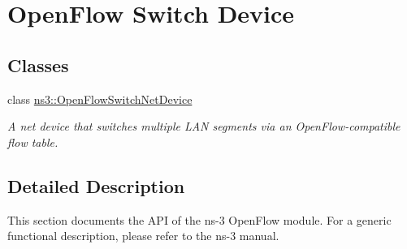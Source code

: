 \hypertarget{group__openflow}{}\section{Open\+Flow Switch Device}
\label{group__openflow}
\subsection*{Classes}
\begin{DoxyCompactItemize}
\item 
class \hyperlink{classns3_1_1OpenFlowSwitchNetDevice}{ns3\+::\+Open\+Flow\+Switch\+Net\+Device}
\begin{DoxyCompactList}\small\item\em A net device that switches multiple L\+AN segments via an Open\+Flow-\/compatible flow table. \end{DoxyCompactList}\end{DoxyCompactItemize}


\subsection{Detailed Description}
This section documents the A\+PI of the ns-\/3 Open\+Flow module. For a generic functional description, please refer to the ns-\/3 manual. 